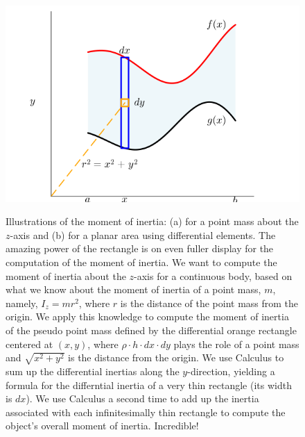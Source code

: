 \begin{figure}[htb]
\begin{minipage}{0.5\textwidth}
\begin{tikzpicture}
    \end{tikzpicture}
    \label{fig:MomentofInertiaPointMass}
\end{minipage}%
\hfill
\begin{minipage}{0.5\textwidth} %
    \centering
    \includegraphics[width=\textwidth]{graphics/Chap03/PlanarAreaWithRectangle4Inertia.png}
    \label{fig:MomentofInertiaDerivation}
\end{minipage}
\caption{Illustrations of the moment of inertia: (a) for a point mass about the $z$-axis and (b) for a planar area using differential elements. The amazing power of the rectangle is on even fuller display for the computation of the moment of inertia. We want to compute the moment of inertia about the $z$-axis for a continuous body, based on what we know about the moment of inertia of a point mass, $m$, namely, $I_z = m r^2$, where $r$ is the distance of the point mass from the origin.  We apply this knowledge to compute the moment of inertia of the pseudo point mass defined by the differential orange rectangle centered at $(x, y)$, where $\rho \cdot h \cdot dx \cdot dy$ plays the role of a point mass and $\sqrt{x^2 + y^2}$ is the distance from the origin. We use Calculus to sum up the differential inertias along the $y$-direction, yielding a formula for the differntial inertia of a very thin rectangle (its width is $dx$). We use Calculus a second time to add up the inertia associated with each infinitesimally thin rectangle to compute the object's overall moment of inertia. Incredible!}
\label{fig:combinedMomentInertia}
\end{figure}








